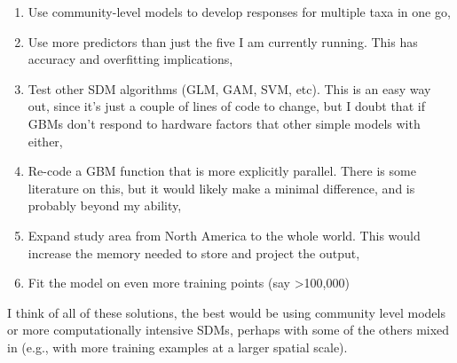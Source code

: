 \documentclass[a4paper]{article}
\begin{document}
\begin{enumerate}
\item Use community-level models to develop responses for multiple taxa in one go,
\item Use more predictors than just the five I am currently running.  This has accuracy and overfitting implications,
\item Test other SDM algorithms (GLM, GAM, SVM, etc).  This is an easy way out, since it's just a couple of lines of code to change, but I doubt that if GBMs don't respond to hardware factors that other simple models with either,
\item Re-code a GBM function that is more explicitly parallel.  There is some literature on this, but it would likely make a minimal difference, and is probably beyond my ability,
\item Expand study area from North America to the whole world.  This would increase the memory needed to store and project the output,
\item Fit the model on even more training points (say >100,000)
\end{enumerate}

I think of all of these solutions, the best would be using community level models or more computationally intensive SDMs, perhaps with some of the others mixed in (e.g., with more training examples at a larger spatial scale).  
\end{document}
